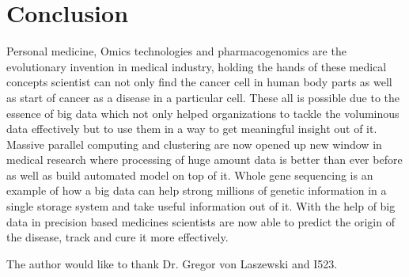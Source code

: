 \documentclass[sigconf]{acmart}
\begin{document}
\section{Conclusion} Personal medicine, Omics technologies and pharmacogenomics are the evolutionary invention in medical industry, holding the hands of these medical concepts scientist can not only find the cancer cell in human body parts as well as start of cancer as a disease in a particular cell. These all is possible due to the essence of big data which not only helped organizations to tackle the voluminous data effectively but to use them in a way to get meaningful insight out of it. Massive parallel computing and clustering are now opened up new window in medical research where processing of huge amount data is better than ever before as well as build automated model on top of it. Whole gene sequencing is an example of how a big data can help strong millions of genetic information in a single storage system and take useful information out of it. With the help of big data in precision based medicines scientists are now able to predict the origin of the disease, track and cure it more effectively.

\begin{acks}

  The author would like to thank Dr. Gregor von Laszewski and I523.

\end{acks}



 
\end{document}
